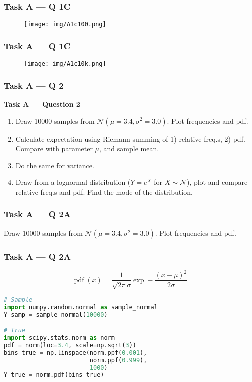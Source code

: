\documentclass[usenames,dvipsnames]{beamer}
\begin{document}
\begin{frame}
\frametitle{Task A --- Q 1C}
\begin{figure}
\centering
\texttt{[image: img/A1c100.png]}
\end{figure}
\end{frame}

\begin{frame}
\frametitle{Task A --- Q 1C}
\begin{figure}
\centering
\texttt{[image: img/A1c10k.png]}
\end{figure}
\end{frame}






















\begin{frame}[fragile]
\frametitle{Task A --- Q 2}

\textbf{Task A --- Question 2}
\begin{enumerate}[label=\alph*]
\item Draw 10000 samples from $\mathcal{N}(\mu=3.4, \sigma^2=3.0)$. Plot frequencies and pdf.
\item Calculate expectation using Riemann summing of 1) relative freq.s, 2) pdf. Compare with parameter $\mu$, and sample mean.
\item Do the same for variance.
\item Draw from a lognormal distribution ($Y=e^X$ for $X \sim \mathcal{N}$), plot and compare relative freq.s and pdf. Find the mode of the distribution.
\end{enumerate}
\end{frame}

\begin{frame}[fragile]
\frametitle{Task A --- Q 2A}
Draw 10000 samples from $\mathcal{N}(\mu=3.4, \sigma^2=3.0)$. Plot frequencies and pdf.
\end{frame}

\begin{frame}[fragile]
\frametitle{Task A --- Q 2A}

$$\operatorname{pdf} (x) = \frac{1}{\sqrt{2\pi} \sigma} \exp - \frac{(x - \mu)^2}{2\sigma}$$

\begin{lstlisting}[language=Python]
# Sample
import numpy.random.normal as sample_normal
Y_samp = sample_normal(10000)

# True
import scipy.stats.norm as norm
pdf = norm(loc=3.4, scale=np.sqrt(3))
bins_true = np.linspace(norm.ppf(0.001),
                        norm.ppf(0.999),
                        1000)
Y_true = norm.pdf(bins_true)
\end{lstlisting}
\end{frame}
\end{document}
